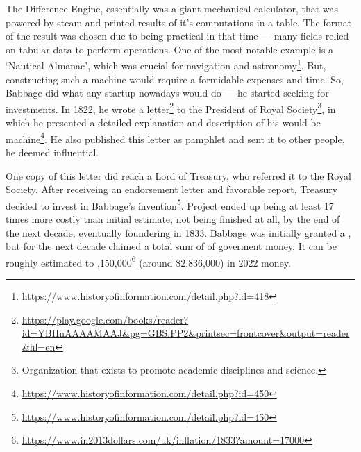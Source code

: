 \documentclass{article}
\begin{document}
            The Difference Engine, essentially was a giant mechanical calculator, that was powered by steam and printed results of it's computations in a table. 
            The format of the result was chosen due to being practical in that time --- many fields relied on tabular data to perform operations. One of the most
            notable example is a `Nautical Almanac', which was crucial for navigation and astronomy\footnote{\href{https://www.historyofinformation.com/detail.php?id=418}
            {https://www.historyofinformation.com/detail.php?id=418}}. But, constructing such a machine would require a formidable expenses and time. So, Babbage did what
            any startup nowadays would do --- he started seeking for investments. 
            In 1822, he wrote a letter\footnote{\href{https://play.google.com/books/reader?id=YBHnAAAAMAAJ&pg=GBS.PP2&printsec=frontcover&output=reader&hl=en}
            {https://play.google.com/books/reader?id=YBHnAAAAMAAJ\&pg=GBS.PP2\&printsec=frontcover\&output=reader\&hl=en}}
            to the President of Royal Society\footnote{Organization that exists to promote academic disciplines and science.}, in which he presented a 
            detailed explanation and description of his would-be machine\footnote{\href{https://www.historyofinformation.com/detail.php?id=450}
            {https://www.historyofinformation.com/detail.php?id=450}}. He also published this letter as pamphlet and sent it to other people, he deemed influential. \par

            One copy of this letter did reach a Lord of Treasury, who referred it to the Royal Society. After receiveing an endorsement letter and favorable report, Treasury
            decided to invest in Babbage's invention\footnote{\href{https://www.historyofinformation.com/detail.php?id=450}{https://www.historyofinformation.com/detail.php?id=450}}.
            Project ended up being at least 17 times more costly tnan initial estimate, not being finished at all, by the end of the next decade, eventually foundering in 1833. Babbage
            was initially granted a , but for the next decade claimed a total sum of  of goverment money. It can be roughly estimated to
            ,150,000\footnote{\href{https://www.in2013dollars.com/uk/inflation/1833?amount=17000}{https://www.in2013dollars.com/uk/inflation/1833?amount=17000}}
            (around \$2,836,000) in 2022 money. \par
\end{document}
